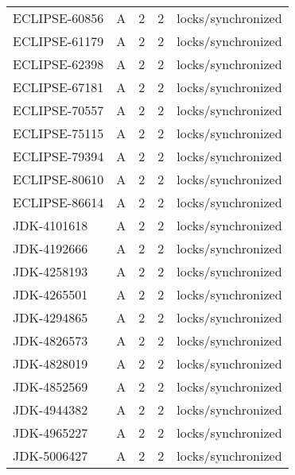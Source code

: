 \begin{table}[!htp]
{\begin{tabular}{lllll}
    ECLIPSE-60856  & A        & 2             & 2               & locks/synchronized                          \\
    ECLIPSE-61179  & A        & 2             & 2               & locks/synchronized                          \\
    ECLIPSE-62398  & A        & 2             & 2               & locks/synchronized                          \\
    ECLIPSE-67181  & A        & 2             & 2               & locks/synchronized                          \\
    ECLIPSE-70557  & A        & 2             & 2               & locks/synchronized                          \\
    ECLIPSE-75115  & A        & 2             & 2               & locks/synchronized                          \\
    ECLIPSE-79394  & A        & 2             & 2               & locks/synchronized                          \\
    ECLIPSE-80610  & A        & 2             & 2               & locks/synchronized                          \\
    ECLIPSE-86614  & A        & 2             & 2               & locks/synchronized                          \\
    JDK-4101618    & A        & 2             & 2               & locks/synchronized                          \\
    JDK-4192666    & A        & 2             & 2               & locks/synchronized                          \\
    JDK-4258193    & A        & 2             & 2               & locks/synchronized                          \\
    JDK-4265501    & A        & 2             & 2               & locks/synchronized                          \\
    JDK-4294865    & A        & 2             & 2               & locks/synchronized                          \\
    JDK-4826573    & A        & 2             & 2               & locks/synchronized                          \\
    JDK-4828019    & A        & 2             & 2               & locks/synchronized                          \\
    JDK-4852569    & A        & 2             & 2               & locks/synchronized                          \\
    JDK-4944382    & A        & 2             & 2               & locks/synchronized                          \\
    JDK-4965227    & A        & 2             & 2               & locks/synchronized                          \\
    JDK-5006427    & A        & 2             & 2               & locks/synchronized                          \\
	\bottomrule
	\end{tabular}
	}
\end{table}

